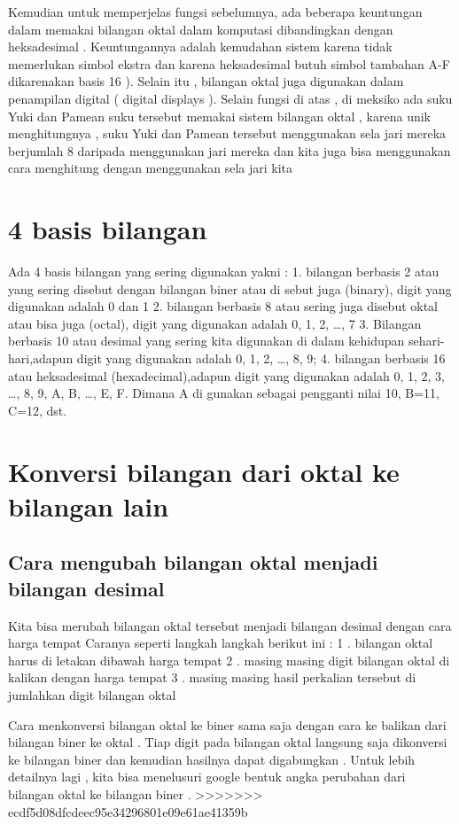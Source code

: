 Kemudian  untuk memperjelas fungsi sebelumnya, ada beberapa keuntungan dalam memakai bilangan oktal dalam komputasi dibandingkan dengan heksadesimal . Keuntungannya adalah kemudahan sistem karena tidak memerlukan simbol ekstra dan karena heksadesimal butuh simbol tambahan A-F dikarenakan basis 16 ). Selain itu , bilangan oktal juga digunakan dalam penampilan digital ( digital displays ).
Selain fungsi di atas  , di meksiko ada suku Yuki dan Pamean suku tersebut memakai sistem bilangan oktal , karena unik menghitungnya , suku Yuki dan Pamean tersebut menggunakan sela jari mereka berjumlah 8 daripada menggunakan jari mereka dan kita juga bisa menggunakan cara menghitung dengan menggunakan sela jari kita 

\section{4 basis bilangan }

Ada 4 basis bilangan yang sering digunakan yakni :
1. bilangan berbasis 2 atau yang sering disebut dengan bilangan biner atau di sebut juga (binary), digit yang digunakan adalah 0 dan 1
2. bilangan berbasis 8 atau sering juga disebut oktal atau bisa juga (octal), digit yang digunakan adalah 0, 1, 2, …, 7
3. Bilangan berbasis 10 atau desimal yang sering kita digunakan di dalam kehidupan sehari-hari,adapun digit yang digunakan adalah 0, 1, 2, …, 8, 9; 
4. bilangan berbasis 16 atau heksadesimal (hexadecimal),adapun digit yang digunakan adalah 0, 1, 2, 3, …, 8, 9, A, B, …, E, F. Dimana A di gunakan sebagai pengganti nilai 10, B=11, C=12, dst.

\section{Konversi bilangan dari oktal ke bilangan lain}
	\subsection{Cara mengubah bilangan oktal menjadi bilangan desimal}

	Kita bisa merubah bilangan oktal tersebut menjadi bilangan desimal dengan cara harga tempat
	Caranya seperti langkah langkah berikut ini :
	1 . bilangan oktal harus di letakan dibawah harga tempat
	2 . masing masing digit bilangan oktal di kalikan dengan harga tempat
	3 . masing masing hasil perkalian tersebut di jumlahkan digit bilangan oktal  
	
	Cara menkonversi bilangan oktal ke biner sama saja dengan cara ke balikan dari bilangan biner ke oktal . Tiap digit pada bilangan oktal langsung saja dikonversi ke bilangan biner dan kemudian hasilnya dapat digabungkan . Untuk lebih detailnya lagi , kita bisa menelusuri google bentuk angka perubahan dari bilangan oktal ke bilangan biner .
	>>>>>>> ecdf5d08dfcdeec95e34296801e09e61ae41359b

